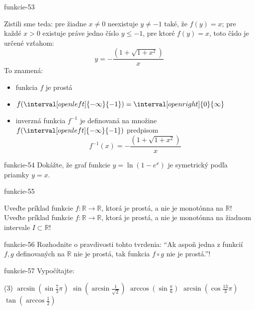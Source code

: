 \begin{defproblem}{funkcie-53}
\begin{solution}
  Zistili sme teda: pre žiadne $x\neq 0$ neexistuje $y\neq -1$ také, že
  $f(y)=x$; pre každé $x>0$ existuje práve jedno číslo $y\leq -1$, pre ktoré
  $f(y)=x$, toto číslo je určené vzťahom:
  \[
    y=-\frac{(1+\sqrt{1+x^2})}{x}
  \]
  To znamená:
  \begin{itemize}
    \item funkcia $f$ je prostá
    \item $f(\interval[open left]{-\infty}{-1})=\interval[open right]{0}{\infty}$
    \item
      inverzná funkcia $f^{-1}$ je definovaná na množine
      $f(\interval[open left]{-\infty}{-1})$ predpisom
      \[
        f^{-1}(x)=-\frac{(1+\sqrt{1+x^2})}{x}
      \]
  \end{itemize}
\end{solution}
\end{defproblem}

\begin{defproblem}{funkcie-54}
Dokážte, že graf funkcie $y=\ln (1-e^x)$ je symetrický podľa priamky $y=x$.
\end{defproblem}

\begin{defproblem}{funkcie-55}
\begin{tasks}
\task
  Uveďte príklad funkcie $f:\mathbb{R}\rightarrow\mathbb{R}$, ktorá je prostá, a
  nie je monotónna na $\mathbb{R}$!
\task
  Uveďte príklad funkcie $f:\mathbb{R}\rightarrow\mathbb{R}$, ktorá je prostá, a
  nie je monotónna na žiadnom intervale $I\subset\mathbb{R}$!
\end{tasks}
\end{defproblem}

\begin{defproblem}{funkcie-56}
Rozhodnite o pravdivosti tohto tvrdenia: \enquote{Ak aspoň jedna z funkcií $f,g$
definovaných na $\mathbb{R}$ nie je prostá, tak funkcia $f\circ g$ nie je
prostá.}!
\end{defproblem}

\begin{defproblem}{funkcie-57}
Vypočítajte:
\begin{tasks}(3)
  \task $\arcsin(\sin \frac{7}{3}\pi)$
  \task $\sin(\arcsin \frac{1}{\sqrt{2}})$
  \task $\arccos(\sin \frac{\pi}{6})$
  \task $\arcsin(\cos \frac{13}{3}\pi)$
  \task $\tan(\arccos\frac{1}{2})$
\end{tasks}
\end{defproblem}

